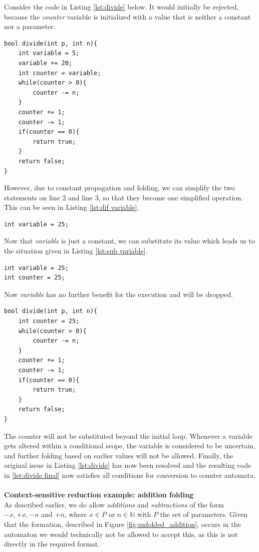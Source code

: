 \documentclass[12pt]{article}
\begin{document}
Consider the code in Listing \ref{lst:divide} below. It would initially be rejected, because the \textit{counter} variable is initialized with a value that is neither a constant nor a parameter.

\begin{lstlisting}[style=CStyle, caption={Example of a function in need of constant propagation}, label={lst:divide}]
bool divide(int p, int n){
	int variable = 5;
	variable += 20;
	int counter = variable;
	while(counter > 0){
		counter -= n;
	}
	counter += 1;
	counter -= 1;
	if(counter == 0){
		return true;
	}
	return false;
}
\end{lstlisting}

However, due to constant propagation and folding, we can simplify the two statements on line 2 and line 3, so that they become one simplified operation. This can be seen in Listing \ref{lst:dif variable}.

\begin{lstlisting}[style=CStyle, caption={Result of simplifying operations on \textit{variable}}, label={lst:dif variable}]
int variable = 25;
\end{lstlisting}

Now that \textit{variable} is just a constant, we can substitute its value which leads us to the situation given in Listing \ref{lst:sub variable}.
\begin{lstlisting}[style=CStyle, caption={Result of substituting \textit{variable}}, label={lst:sub variable}]
int variable = 25;
int counter = 25;
\end{lstlisting}

Now \textit{variable} has no further benefit for the execution and will be dropped. 

\begin{lstlisting}[style=CStyle, caption={Final version of the simplified function}, label={lst:divide final}]
bool divide(int p, int n){
	int counter = 25;
	while(counter > 0){
		counter -= n;
	}
	counter += 1;
	counter -= 1;
	if(counter == 0){
		return true;
	}
	return false;
}
\end{lstlisting}

The counter will not be substituted beyond the initial loop. Whenever a variable gets altered within a conditional scope, the variable is considered to be uncertain, and further folding based on earlier values will not be allowed. Finally, the original issue in Listing \ref{lst:divide} has now been resolved and the resulting code in \ref{lst:divide final} now satisfies all conditions for conversion to counter automata.\\
\\
\noindent
\textbf{Context-sensitive reduction example: addition folding}\\
As described earlier, we do allow \textit{additions} and \textit{subtractions} of the form $-x, +x, -n$ and $+n$, where $x \in P$ or $n \in \mathbb{N}$ with $P$ the set of parameters. Given that the formation, described in Figure \ref{fig:unfolded_addition}, occurs in the automaton we would technically not be allowed to accept this, as this is not directly in the required format.
\end{document}
